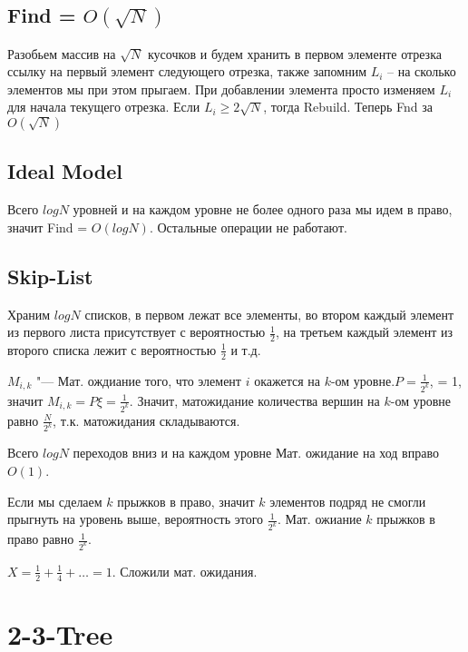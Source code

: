 \subsection{Find = $O(\sqrt{N})$}

Разобьем массив на $\sqrt{N}$ кусочков и будем хранить в первом элементе отрезка ссылку на первый элемент следующего отрезка, также запомним $L_{i}$ -- на сколько элементов мы при этом прыгаем. При добавлении элемента просто изменяем $L_{i}$ для начала текущего отрезка. Если $L_{i} \geqslant 2 \sqrt{N}$, тогда Rebuild. Теперь Fnd за $O(\sqrt{N})$\\



\subsection{Ideal Model}


Всего $log{N}$ уровней и на каждом уровне не более одного раза мы идем в право, значит Find = $O(log{N})$. Остальные операции не работают.


\subsection{Skip-List}

Храним $log{N}$ списков, в первом лежат все элементы, во втором каждый элемент из первого листа присутствует с вероятностью $\frac{1}{2}$, на третьем каждый элемент из второго списка лежит с вероятностью $\frac{1}{2}$ и т.д.

$M_{i, k}$ "--- Мат. ождиание того, что элемент $i$ окажется на $k$-ом уровне.$ P = \frac{1}{2^{k}}$, \xi = 1, значит $M_{i,k} = P \xi = \frac{1}{2^{k}}$.
Значит, матожидание количества вершин на $k$-ом уровне равно $\frac{N}{2^{k}}$, т.к. матожидания складываются.

Всего $log{N}$ переходов вниз и на каждом уровне Мат. ожидание на ход вправо $O(1)$.

Если мы сделаем $k$ прыжков в право, значит $k$ элементов подряд не смогли прыгнуть на уровень выше, вероятность этого $\frac{1}{2^{k}}$. Мат. ожиание $k$ прыжков в право равно $\frac{1}{2^{k}}$.

$X = \frac{1}{2} + \frac{1}{4} + \dots = 1$. Сложили мат. ожидания.

\section{2-3-Tree}

